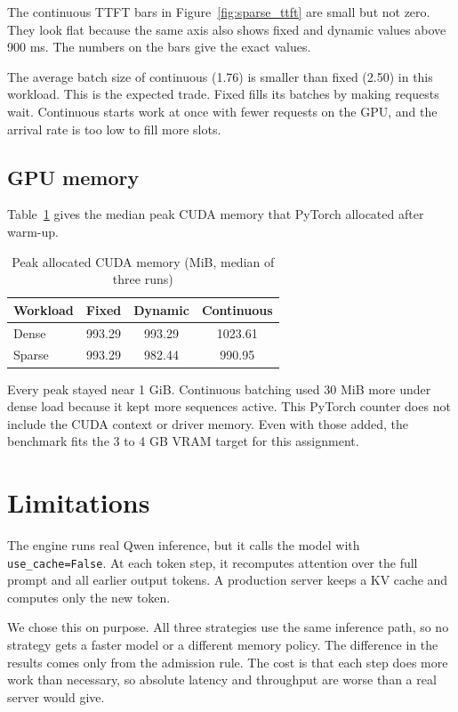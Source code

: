 \documentclass[12pt,a4paper]{article}
\begin{document}
The continuous TTFT bars in Figure~\ref{fig:sparse_ttft} are small but not zero. They look flat because the same axis also shows fixed and dynamic values above 900 ms. The numbers on the bars give the exact values.

The average batch size of continuous (1.76) is smaller than fixed (2.50) in this workload. This is the expected trade. Fixed fills its batches by making requests wait. Continuous starts work at once with fewer requests on the GPU, and the arrival rate is too low to fill more slots.

\subsection{GPU memory}
Table~\ref{tab:mem} gives the median peak CUDA memory that PyTorch allocated after warm-up.

\begin{table}[H]
\centering
\caption{Peak allocated CUDA memory (MiB, median of three runs)}
\label{tab:mem}
\begin{tabular}{lccc}
\toprule
\textbf{Workload} & \textbf{Fixed} & \textbf{Dynamic} & \textbf{Continuous} \\
\midrule
Dense & 993.29 & 993.29 & 1023.61 \\
Sparse & 993.29 & 982.44 & 990.95 \\
\bottomrule
\end{tabular}
\end{table}

Every peak stayed near 1 GiB. Continuous batching used 30 MiB more under dense load because it kept more sequences active. This PyTorch counter does not include the CUDA context or driver memory. Even with those added, the benchmark fits the 3 to 4 GB VRAM target for this assignment.

\section{Limitations}
The engine runs real Qwen inference, but it calls the model with \texttt{use\_cache=False}. At each token step, it recomputes attention over the full prompt and all earlier output tokens. A production server keeps a KV cache and computes only the new token.

We chose this on purpose. All three strategies use the same inference path, so no strategy gets a faster model or a different memory policy. The difference in the results comes only from the admission rule. The cost is that each step does more work than necessary, so absolute latency and throughput are worse than a real server would give.
\end{document}
